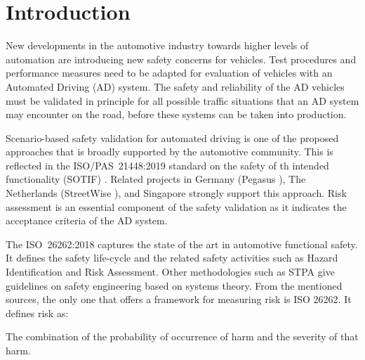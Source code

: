 \section{Introduction}
\label{sec:introduction}


New developments in the automotive industry towards higher levels of automation are introducing new safety concerns for vehicles. Test procedures and performance measures need to be adapted for evaluation of vehicles with an Automated Driving (AD) system. The safety and reliability of the AD vehicles must be validated in principle for all possible traffic situations that an AD system may encounter on the road, before these systems can be taken into production.

Scenario-based safety validation for automated driving is one of the proposed approaches that is broadly supported by the automotive community. This is reflected in the ISO/PAS~21448:2019 standard on the safety of th intended functionality (SOTIF) \cite{ISO21448}. Related projects in Germany (Pegasus \cite{putz2017pegasus}), The Netherlands (StreetWise \cite{elrofai2018scenario}), and Singapore \cite{ploeg2018cetran} strongly support this approach. Risk assessment is an essential component of the safety validation as it indicates the acceptance criteria of the AD system.

The ISO~26262:2018 \cite{ISO26262} captures the state of the art in automotive functional safety. It defines the safety life-cycle and the related safety activities such as Hazard Identification and Risk Assessment. Other methodologies such as STPA \cite{leveson2013stpa} give guidelines on safety engineering based on systems theory. From the mentioned sources, the only one that offers a framework for measuring risk is ISO 26262. It defines risk as:
\begin{definition}
	The combination of the probability of occurrence of harm and the severity of that harm.
\end{definition}

